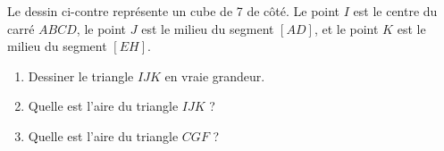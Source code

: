 
\begin{exercice}\label{exoSeconde-0095}

    \begin{multicols}{2}

        Le dessin ci-contre représente un cube de \unit{7}{\centi\meter} de côté. Le point \( I\) est le centre du carré \( ABCD\), le point \( J\) est le milieu du segment \( [AD]\), et le point \( K\) est le milieu du segment \( [EH]\).

        \begin{enumerate}
    \item
        Dessiner le triangle \( IJK\) en vraie grandeur.
            \item
        Quelle est l'aire du triangle \( IJK\) ?
    \item
    Quelle est l'aire du triangle \( CGF\) ?
        \end{enumerate}

        \columnbreak

        \begin{center}

        \end{center}

    \end{multicols}
    

\end{exercice}



